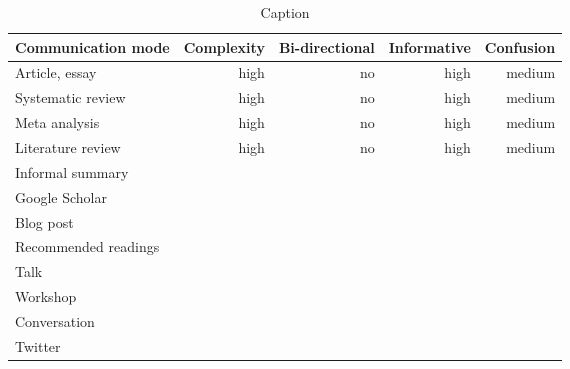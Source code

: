 \begin{table*}\centering
{}
\begin{tabular}{@{}lrrrr@{}}\toprule
Communication mode & Complexity & Bi-directional & Informative  & Confusion
\\\midrule
Article, essay & high & no & high & medium  \\
Systematic review & high & no & high & medium\\
Meta analysis & high & no & high & medium\\
Literature review & high & no & high & medium\\
Informal summary \\
Google Scholar \\
Blog post \\
Recommended readings \\
Talk \\
Workshop \\
Conversation \\
Twitter \\


\bottomrule
\end{tabular}
\caption{Caption}
\end{table*}